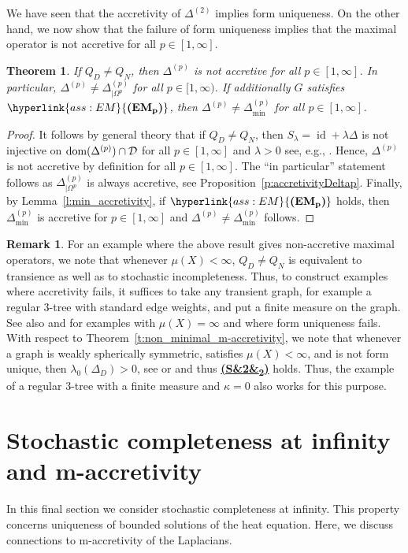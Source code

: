\documentclass[letterpaper]{article}
\newtheorem{theorem}[lemma]{Theorem}
\theoremstyle{definition}
\newtheorem{remark}[lemma]{Remark}
\theoremstyle{named}
\numberwithin{equation}{section}
\newcommand{\EMp}{\hyperlink{ass:EM}{\textup{\textbf{(EM\textsubscript{p})}}}}
\newcommand{\SP}[1][]{\hyperlink{ass:SP}{\textup{\textbf{(S\ifx&#1&\else\textsubscript{#1}\fi)}}}}
\newcommand{\QD}{Q_{D}}
\newcommand{\QN}{Q_{N}}
\newcommand{\D}{\mathcal{D}}
\newcommand{\lm}{\lambda}
\newcommand{\dom}{\textnormal{dom}} %
\newcommand{\id}{\operatorname{id}}
\begin{document}
We have seen that the accretivity of $\Delta^{(2)}$ implies form uniqueness.
On the other hand, 
we now show that the failure of form uniqueness implies that the maximal operator is not accretive
for all $p \in [1,\infty]$.
\begin{theorem}\label{t:counter}
If $\QD \neq \QN$,  
then $\Delta^{(p)}$ is not accretive for all $p \in [1,\infty]$.
In particular, $\Delta^{(p)} \neq \Delta^{(p)}_{|\Omega^{p}}$ for all $p \in [1,\infty)$. 
If additionally $G$ satisfies $\EMp$, then
$\Delta^{(p)} \neq \Delta^{(p)}_{\min}$ for all $p \in [1,\infty]$.
\end{theorem}
\begin{proof}
It follows by general theory that if $\QD \neq \QN$,
then
$S_\lambda= \id + \lambda \Delta$ is not injective on $\dom(\Delta^{(p)}) \cap \D$ for 
all $p \in [1,\infty]$ and $\lambda>0$
see, e.g., \cite[Theorem~3.2]{keller2021graphs}. Hence, $\Delta^{(p)}$ is not
accretive by definition for all $p \in [1,\infty]$. 
The ``in particular'' statement follows as $\Delta^{(p)}_{| \Omega^{p}}$
is always accretive, see Proposition~\ref{p:accretivityDeltap}.
Finally, 
by Lemma~\ref{l:min_accretivity}, if $\EMp$ holds, then $\Delta_{\min}^{(p)}$ is accretive for $p \in [1,\infty]$
and $\Delta^{(p)} \neq \Delta_{\min}^{(p)}$ follows.
\end{proof}


\begin{remark}\label{rem:LneqL|omega}
For an example where the above result gives non-accretive maximal operators,
we note that whenever $\mu(X) < \infty$, $\QD \neq \QN$ is
equivalent to transience as well as to
stochastic incompleteness. Thus, to construct examples where accretivity fails,
it suffices to take any transient graph, for example a regular
3-tree with standard edge weights, and put a finite measure on the graph. See also \cite{HKMRW} and \cite{HKMW13} 
for examples with $\mu(X)=\infty$ and where form uniqueness fails.
With respect to Theorem~\ref{t:non_minimal_m-accretivity}, we note that
whenever a graph is weakly spherically symmetric, satisfies $\mu(X)<\infty$,
and is not form unique, then $\lm_0(\Delta_D) > 0$, see \cite{KLW13} or \cite[Theorem~9.15]{keller2021graphs} and thus \SP[2] holds.
Thus, the example of a regular 3-tree with a finite measure 
and $\kappa=0$ also works for this purpose.
\end{remark}

\section{\texorpdfstring{Stochastic completeness at infinity and m-accretivity}{Stochastic completeness at infinity and m-accretivity}}\label{s:sc_and_acc}
In this final section we consider stochastic completeness at infinity.
This property concerns uniqueness of bounded solutions of the heat equation. Here, 
we discuss connections to m-accretivity of the Laplacians.
\end{document}
